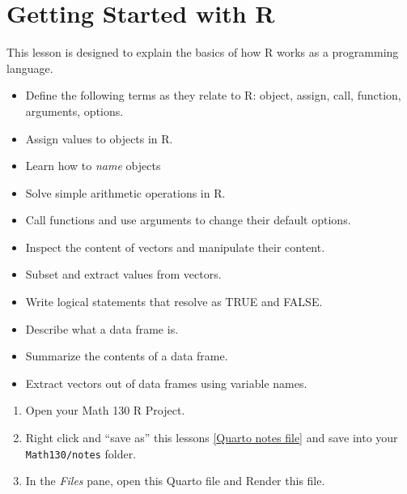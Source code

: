 \documentclass[
  letterpaper,
  DIV=11,
  numbers=noendperiod,
  oneside]{scrreprt}
\providecommand{\tightlist}{%
  \setlength{\itemsep}{0pt}\setlength{\parskip}{0pt}}\usepackage{longtable,booktabs,array}
\begin{document}
\chapter{Getting Started with R}\label{sec-intro_r}

This lesson is designed to explain the basics of how R works as a
programming language.

\begin{tcolorbox}[enhanced jigsaw, bottomrule=.15mm, colback=white, colframe=quarto-callout-note-color-frame, toprule=.15mm, coltitle=black, rightrule=.15mm, opacitybacktitle=0.6, colbacktitle=quarto-callout-note-color!10!white, toptitle=1mm, leftrule=.75mm, breakable, bottomtitle=1mm, titlerule=0mm, title={🎓 Learning Objectives}, arc=.35mm, left=2mm, opacityback=0]

\begin{itemize}
\tightlist
\item
  Define the following terms as they relate to R: object, assign, call,
  function, arguments, options.
\item
  Assign values to objects in R.
\item
  Learn how to \emph{name} objects
\item
  Solve simple arithmetic operations in R.
\item
  Call functions and use arguments to change their default options.
\item
  Inspect the content of vectors and manipulate their content.
\item
  Subset and extract values from vectors.
\item
  Write logical statements that resolve as TRUE and FALSE.
\item
  Describe what a data frame is.
\item
  Summarize the contents of a data frame.
\item
  Extract vectors out of data frames using variable names.
\end{itemize}

\end{tcolorbox}

\begin{tcolorbox}[enhanced jigsaw, bottomrule=.15mm, colback=white, colframe=quarto-callout-tip-color-frame, toprule=.15mm, coltitle=black, rightrule=.15mm, opacitybacktitle=0.6, colbacktitle=quarto-callout-tip-color!10!white, toptitle=1mm, leftrule=.75mm, breakable, bottomtitle=1mm, titlerule=0mm, title={👉 Prepare}, arc=.35mm, left=2mm, opacityback=0]

\begin{enumerate}
\def\labelenumi{\arabic{enumi}.}
\tightlist
\item
  Open your Math 130 R Project.
\item
  Right click and ``save as'' this lessons
  \href{notes/intro_r_notes.qmd}{{[}Quarto notes file{]}} and save into
  your \texttt{Math130/notes} folder.
\item
  In the \emph{Files} pane, open this Quarto file and Render this file.
\end{enumerate}

\end{tcolorbox}
\end{document}
